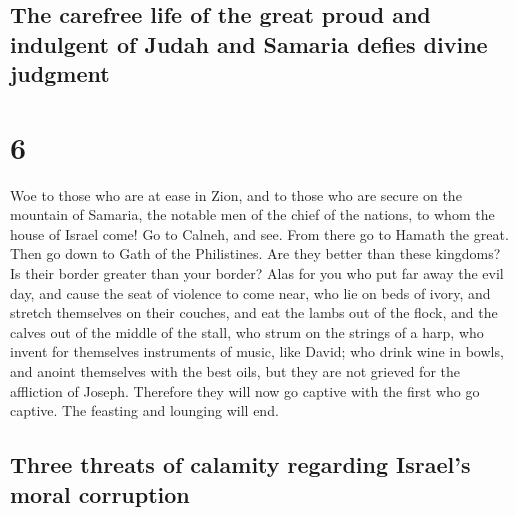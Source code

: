 \hypertarget{the-carefree-life-of-the-great-proud-and-indulgent-of-judah-and-samaria-defies-divine-judgment}{%
\subsection{The carefree life of the great proud and indulgent of Judah
and Samaria defies divine
judgment}\label{the-carefree-life-of-the-great-proud-and-indulgent-of-judah-and-samaria-defies-divine-judgment}}

\hypertarget{section-5}{%
\section{6}\label{section-5}}

 Woe to those who are at ease in Zion, and to those who
are secure on the mountain of Samaria, the notable men of the chief of
the nations, to whom the house of Israel come!  Go to
Calneh, and see. From there go to Hamath the great. Then go down to Gath
of the Philistines. Are they better than these kingdoms? Is their border
greater than your border?  Alas for you who put far away
the evil day, and cause the seat of violence to come near,
 who lie on beds of ivory, and stretch themselves on their
couches, and eat the lambs out of the flock, and the calves out of the
middle of the stall,  who strum on the strings of a harp,
who invent for themselves instruments of music, like David;
 who drink wine in bowls, and anoint themselves with the
best oils, but they are not grieved for the affliction of Joseph.
 Therefore they will now go captive with the first who go
captive. The feasting and lounging will end.

\hypertarget{three-threats-of-calamity-regarding-israels-moral-corruption}{%
\subsection{Three threats of calamity regarding Israel's moral
corruption}\label{three-threats-of-calamity-regarding-israels-moral-corruption}}

